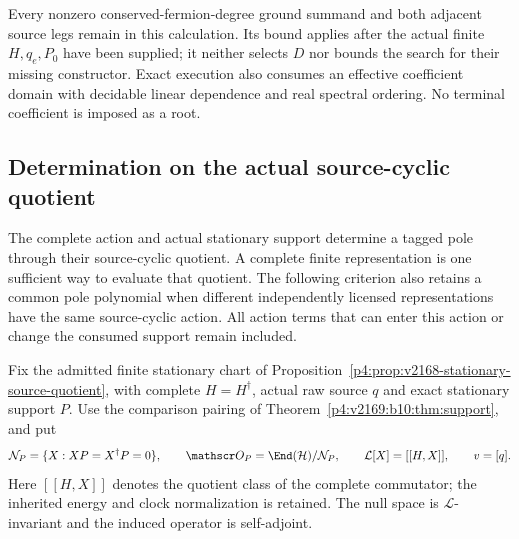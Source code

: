 \documentclass[12pt,a4paper]{article}
\begin{document}
Every nonzero conserved-fermion-degree ground summand and both adjacent
source legs remain in this calculation. Its bound applies after the actual
finite $H,q_e,P_0$ have been supplied; it neither selects $D$ nor bounds
the search for their missing constructor. Exact execution also consumes an
effective coefficient domain with decidable linear dependence and real
spectral ordering. No terminal coefficient is imposed as a root.







\subsection{Determination on the actual source-cyclic quotient}
\label{p4:sec:v2186-source-cyclic-determinacy}

The complete action and actual stationary support determine a tagged pole
through their source-cyclic quotient.  A complete finite representation is
one sufficient way to evaluate that quotient.  The following criterion also
retains a common pole polynomial when different independently licensed
representations have the same source-cyclic action.  All action terms that
can enter this action or change the consumed support remain included.

Fix the admitted finite stationary chart of
Proposition~\ref{p4:prop:v2168-stationary-source-quotient}, with complete
$H=H^\dagger$, actual raw source $q$ and exact stationary support $P$.
Use the comparison pairing of
Theorem~\ref{p4:v2169:b10:thm:support}, and put
\[
 \mathcal N_P=\{X:XP=X^\dagger P=0\},\qquad
 \mathscr O_P=\End(\mathcal H)/\mathcal N_P,\qquad
 \mathcal L[X]=[[H,X]],\qquad v=[q].
\]
Here $[[H,X]]$ denotes the quotient class of the complete commutator;
the inherited energy and clock normalization is retained.  The null space
is $\mathcal L$-invariant and the induced operator is self-adjoint.
\end{document}
